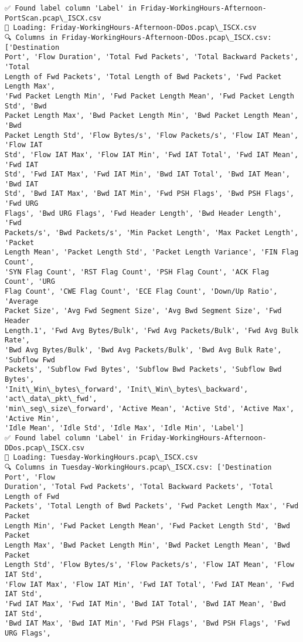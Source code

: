 \documentclass[11pt]{article}
\begin{document}
\begin{Verbatim}[commandchars=\\\{\}]
✅ Found label column 'Label' in Friday-WorkingHours-Afternoon-
PortScan.pcap\_ISCX.csv
📅 Loading: Friday-WorkingHours-Afternoon-DDos.pcap\_ISCX.csv
🔍 Columns in Friday-WorkingHours-Afternoon-DDos.pcap\_ISCX.csv: ['Destination
Port', 'Flow Duration', 'Total Fwd Packets', 'Total Backward Packets', 'Total
Length of Fwd Packets', 'Total Length of Bwd Packets', 'Fwd Packet Length Max',
'Fwd Packet Length Min', 'Fwd Packet Length Mean', 'Fwd Packet Length Std', 'Bwd
Packet Length Max', 'Bwd Packet Length Min', 'Bwd Packet Length Mean', 'Bwd
Packet Length Std', 'Flow Bytes/s', 'Flow Packets/s', 'Flow IAT Mean', 'Flow IAT
Std', 'Flow IAT Max', 'Flow IAT Min', 'Fwd IAT Total', 'Fwd IAT Mean', 'Fwd IAT
Std', 'Fwd IAT Max', 'Fwd IAT Min', 'Bwd IAT Total', 'Bwd IAT Mean', 'Bwd IAT
Std', 'Bwd IAT Max', 'Bwd IAT Min', 'Fwd PSH Flags', 'Bwd PSH Flags', 'Fwd URG
Flags', 'Bwd URG Flags', 'Fwd Header Length', 'Bwd Header Length', 'Fwd
Packets/s', 'Bwd Packets/s', 'Min Packet Length', 'Max Packet Length', 'Packet
Length Mean', 'Packet Length Std', 'Packet Length Variance', 'FIN Flag Count',
'SYN Flag Count', 'RST Flag Count', 'PSH Flag Count', 'ACK Flag Count', 'URG
Flag Count', 'CWE Flag Count', 'ECE Flag Count', 'Down/Up Ratio', 'Average
Packet Size', 'Avg Fwd Segment Size', 'Avg Bwd Segment Size', 'Fwd Header
Length.1', 'Fwd Avg Bytes/Bulk', 'Fwd Avg Packets/Bulk', 'Fwd Avg Bulk Rate',
'Bwd Avg Bytes/Bulk', 'Bwd Avg Packets/Bulk', 'Bwd Avg Bulk Rate', 'Subflow Fwd
Packets', 'Subflow Fwd Bytes', 'Subflow Bwd Packets', 'Subflow Bwd Bytes',
'Init\_Win\_bytes\_forward', 'Init\_Win\_bytes\_backward', 'act\_data\_pkt\_fwd',
'min\_seg\_size\_forward', 'Active Mean', 'Active Std', 'Active Max', 'Active Min',
'Idle Mean', 'Idle Std', 'Idle Max', 'Idle Min', 'Label']
✅ Found label column 'Label' in Friday-WorkingHours-Afternoon-DDos.pcap\_ISCX.csv
📅 Loading: Tuesday-WorkingHours.pcap\_ISCX.csv
🔍 Columns in Tuesday-WorkingHours.pcap\_ISCX.csv: ['Destination Port', 'Flow
Duration', 'Total Fwd Packets', 'Total Backward Packets', 'Total Length of Fwd
Packets', 'Total Length of Bwd Packets', 'Fwd Packet Length Max', 'Fwd Packet
Length Min', 'Fwd Packet Length Mean', 'Fwd Packet Length Std', 'Bwd Packet
Length Max', 'Bwd Packet Length Min', 'Bwd Packet Length Mean', 'Bwd Packet
Length Std', 'Flow Bytes/s', 'Flow Packets/s', 'Flow IAT Mean', 'Flow IAT Std',
'Flow IAT Max', 'Flow IAT Min', 'Fwd IAT Total', 'Fwd IAT Mean', 'Fwd IAT Std',
'Fwd IAT Max', 'Fwd IAT Min', 'Bwd IAT Total', 'Bwd IAT Mean', 'Bwd IAT Std',
'Bwd IAT Max', 'Bwd IAT Min', 'Fwd PSH Flags', 'Bwd PSH Flags', 'Fwd URG Flags',

\end{Verbatim}
\end{document}
